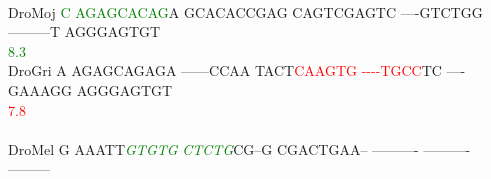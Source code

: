 \documentclass[11pt,twoside,reqno,a4paper]{article}
\begin{document}
{\hspace*{7\charwidth}\hspace*{1\charwidth}\hspace*{1\charwidth}\hspace*{1\charwidth}\hspace*{1\charwidth}\hspace*{1\charwidth}\hspace*{1\charwidth}\\
DroMoj	\textcolor{Green}{C}	\textcolor{Green}{A}\textcolor{Green}{G}\textcolor{Green}{A}\textcolor{Green}{G}\textcolor{Green}{C}\textcolor{Green}{A}\textcolor{Green}{C}\textcolor{Green}{A}\textcolor{Green}{G}A	GCACACCGAG	CAGTCGAGTC	----GTCTGG	---------T	AGGGAGTGT\\
\hspace*{7\charwidth}\hspace*{0\charwidth}\textcolor{Green}{8.3}\hspace*{1\charwidth}\hspace*{1\charwidth}\hspace*{1\charwidth}\hspace*{1\charwidth}\hspace*{1\charwidth}\hspace*{1\charwidth}\\
DroGri	A	AGAGCAGAGA	------CCAA	TACT\textcolor{Red}{C}\textcolor{Red}{A}\textcolor{Red}{A}\textcolor{Red}{G}\textcolor{Red}{T}\textcolor{Red}{G}	\textcolor{Red}{-}\textcolor{Red}{-}\textcolor{Red}{-}\textcolor{Red}{-}\textcolor{Red}{T}\textcolor{Red}{G}\textcolor{Red}{C}\textcolor{Red}{C}TC	----GAAAGG	AGGGAGTGT\\
\hspace*{7\charwidth}\hspace*{1\charwidth}\hspace*{1\charwidth}\hspace*{1\charwidth}\hspace*{25\charwidth}\textcolor{Red}{7.8}\hspace*{1\charwidth}\hspace*{1\charwidth}\hspace*{1\charwidth}\\
\\
DroMel	G	AAATT\textit{\textcolor{Green}{G}}\textit{\textcolor{Green}{T}}\textit{\textcolor{Green}{G}}\textit{\textcolor{Green}{T}}\textit{\textcolor{Green}{G}}	\textit{\textcolor{Green}{C}}\textit{\textcolor{Green}{T}}\textit{\textcolor{Green}{C}}\textit{\textcolor{Green}{T}}\textit{\textcolor{Green}{G}}CG--G	CGACTGAA--	----------	----------	---------\\
}
\end{document}
